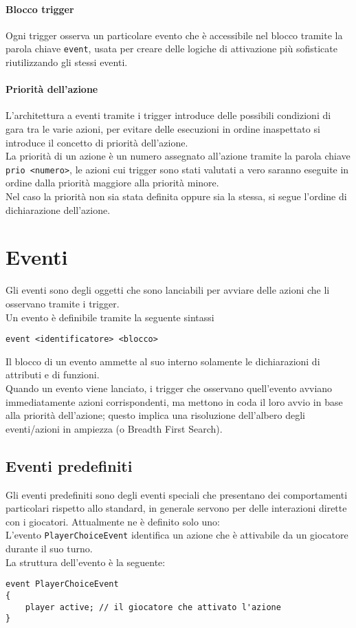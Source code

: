 \paragraph{Blocco trigger}
Ogni trigger osserva un particolare evento che è accessibile nel blocco tramite la parola chiave 
\lstinline|event|, usata per creare delle logiche di attivazione più sofisticate riutilizzando gli stessi eventi. \\

\paragraph{Priorità dell'azione}
L'architettura a eventi tramite i trigger introduce delle possibili condizioni di gara tra le varie azioni,
per evitare delle esecuzioni in ordine inaspettato si introduce il concetto di priorità dell'azione. \\
La priorità di un azione è un numero assegnato all'azione tramite la parola chiave \\
\lstinline|prio <numero>|,
le azioni cui trigger sono stati valutati a vero saranno eseguite in ordine dalla priorità maggiore
alla priorità minore. \\
Nel caso la priorità non sia stata definita oppure sia la stessa, si segue l'ordine di dichiarazione dell'azione.

\section{Eventi}
Gli eventi sono degli oggetti che sono lanciabili per avviare delle azioni che li osservano tramite i trigger. \\
Un evento è definibile tramite la seguente sintassi
\begin{lstlisting}
event <identificatore> <blocco>
\end{lstlisting}
Il blocco di un evento ammette al suo interno solamente le dichiarazioni di attributi e di funzioni. \\
Quando un evento viene lanciato, i trigger che osservano quell'evento avviano immediatamente azioni corrispondenti,
ma mettono in coda il loro avvio in base alla priorità dell'azione; questo implica
una risoluzione dell'albero degli eventi/azioni in ampiezza (o Breadth First Search).

\subsection{Eventi predefiniti}
Gli eventi predefiniti sono degli eventi speciali che presentano dei comportamenti particolari rispetto 
allo standard, in generale servono per delle interazioni dirette con i giocatori.
Attualmente ne è definito solo uno: \\
L'evento \lstinline|PlayerChoiceEvent| identifica un azione che è attivabile da un giocatore durante il suo turno. \\
La struttura dell'evento è la seguente:
\begin{lstlisting}
event PlayerChoiceEvent
{
    player active; // il giocatore che attivato l'azione
}
\end{lstlisting}

